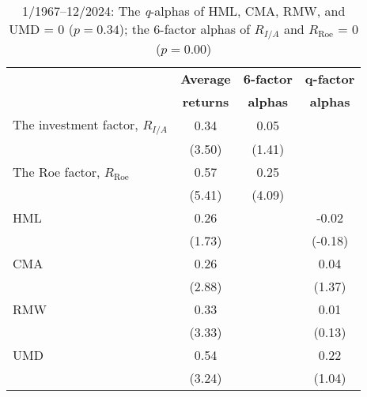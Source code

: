 \begin{table}[htbp]
\centering
\caption*{\small 1/1967--12/2024: The \textit{q}-alphas of HML, CMA, RMW, and UMD = 0 ($p = 0.34$); the 6-factor alphas of $R_{I/A}$ and $R_{\text{Roe}}$ = 0 ($p = 0.00$)}
\begin{tabular}{lccc}
\toprule
 & \textbf{Average} & \textbf{6-factor} & \textbf{q-factor} \\
 & \textbf{returns} & \textbf{alphas} & \textbf{alphas} \\
\midrule
The investment factor, $R_{I/A}$ & 0.34 & 0.05 &  \\
 & (3.50) & (1.41) &  \\
The Roe factor, $R_{\text{Roe}}$ & 0.57 & 0.25 &  \\
 & (5.41) & (4.09) &  \\
HML & 0.26 &  & -0.02 \\
 & (1.73) &  & (-0.18) \\
CMA & 0.26 &  & 0.04 \\
 & (2.88) &  & (1.37) \\
RMW & 0.33 &  & 0.01 \\
 & (3.33) &  & (0.13) \\
UMD & 0.54 &  & 0.22 \\
 & (3.24) &  & (1.04) \\
\bottomrule
\end{tabular}
\end{table}
